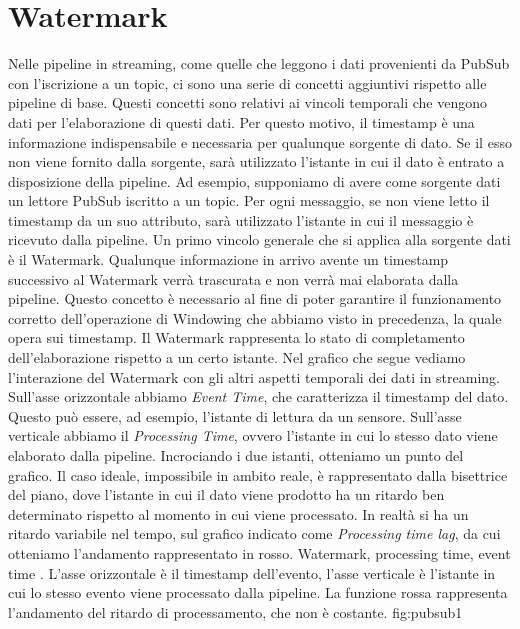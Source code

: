 \section{Watermark}\label{watermark}
Nelle pipeline in streaming, come quelle che leggono i dati provenienti da PubSub con l’iscrizione a un topic, ci sono una serie di concetti aggiuntivi rispetto alle pipeline di base. Questi concetti sono relativi ai vincoli temporali che vengono dati per l’elaborazione di questi dati. Per questo motivo, il timestamp è una informazione indispensabile e necessaria per qualunque sorgente di dato. Se il esso non viene fornito dalla sorgente, sarà utilizzato l’istante in cui il dato è entrato a disposizione della pipeline. Ad esempio, supponiamo di avere come sorgente dati un lettore PubSub iscritto a un topic. Per ogni messaggio, se non viene letto il timestamp da un suo attributo, sarà utilizzato l’istante in cui il messaggio è ricevuto dalla pipeline.
Un primo vincolo generale che si applica alla sorgente dati è il Watermark. Qualunque informazione in arrivo avente un timestamp successivo al Watermark verrà trascurata e non verrà mai elaborata dalla pipeline. Questo concetto è necessario al fine di poter garantire il funzionamento corretto dell’operazione di Windowing che abbiamo visto in precedenza, la quale opera sui timestamp. Il Watermark rappresenta lo stato di completamento dell’elaborazione rispetto a un certo istante. Nel grafico che segue vediamo l’interazione del Watermark con gli altri aspetti temporali dei dati in streaming. Sull’asse orizzontale abbiamo \textit{Event Time}, che caratterizza il timestamp del dato. Questo può essere, ad esempio, l'istante di lettura da un sensore. Sull’asse verticale abbiamo il \textit{Processing Time}, ovvero l’istante in cui lo stesso dato viene elaborato dalla pipeline. Incrociando i due istanti, otteniamo un punto del grafico. Il caso ideale, impossibile in ambito reale, è rappresentato dalla bisettrice del piano, dove l’istante in cui il dato viene prodotto ha un ritardo ben determinato rispetto al momento in cui viene processato. In realtà si ha un ritardo variabile nel tempo, sul grafico indicato come \textit{Processing time lag}, da cui otteniamo l’andamento rappresentato in rosso.
{Watermark, processing time, event time \cite{akidauchernyaklax}. L'asse orizzontale è il timestamp dell'evento, l'asse verticale è l'istante in cui lo stesso evento viene processato dalla pipeline. La funzione rossa rappresenta l'andamento del ritardo di processamento, che non è costante. } 
{fig:pubsub1}
